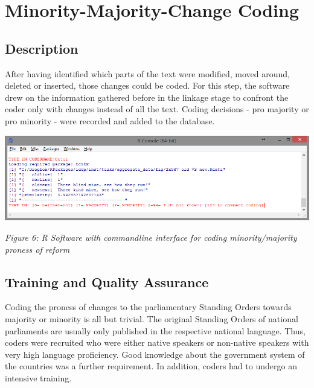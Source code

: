 \documentclass[10pt,]{article}
\begin{document}
\newpage

\section{Minority-Majority-Change
Coding}\label{minority-majority-change-coding}

\subsection{Description}\label{description-1}

After having identified which parts of the text were modified, moved
around, deleted or inserted, those changes could be coded. For this
step, the software drew on the information gathered before in the
linkage stage to confront the coder only with changes instead of all the
text. Coding decisions - pro majority or pro minority - were recorded
and added to the database.

\begin{center}
\includegraphics[width=\textwidth]{fig/minmaj.png}
\end{center}

\emph{Figure 6: R Software with commandline interface for coding
minority/majority proness of reform}

\subsection{Training and Quality
Assurance}\label{training-and-quality-assurance}

Coding the proness of changes to the parliamentary Standing Orders
towards majority or minority is all but trivial. The original Standing
Orders of national parliaments are usually only published in the
respective national language. Thus, coders were recruited who were
either native speakers or non-native speakers with very high language
proficiency. Good knowledge about the government system of the countries
was a further requirement. In addition, coders had to undergo an
intensive training.
\end{document}
